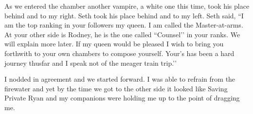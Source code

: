 As we entered the chamber another vampire, a white one this time, took his place behind and to my right. Seth took his place behind and to my left. Seth said, ``I am the top ranking in your followers my queen. I am called the Master-at-arms. At your other side is Rodney, he is the one called “Counsel’’ in your ranks. We will explain more later. If my queen would be pleased I wish to bring you forthwith to your own chambers to compose yourself. Your’s has been a hard journey thusfar and I speak not of the meager train trip.’’

I nodded in agreement and we started forward. I was able to refrain from the firewater and yet by the time we got to the other side it looked like Saving Private Ryan and my companions were holding me up to the point of dragging me. 








 